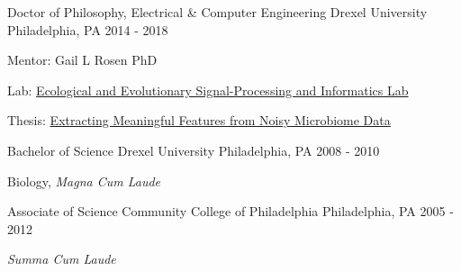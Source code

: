 \begin{cventries}
  \cventry
    {Doctor of Philosophy, Electrical \& Computer Engineering} %
    {Drexel University} %
    {Philadelphia, PA} %
    {2014 - 2018} %
    {
      \begin{cvitems} %
         \item Mentor: Gail L Rosen PhD
         \item Lab: \href{http://drexeleesi.com/}{Ecological and Evolutionary Signal-Processing and Informatics Lab}
	 \item Thesis: \href{https://idea.library.drexel.edu/islandora/object/idea\%3A8189}{Extracting Meaningful Features from Noisy Microbiome Data}
      \end{cvitems}
    }
    
  \cventry
    {Bachelor of Science} %
    {Drexel University} %
    {Philadelphia, PA} %
    {2008 - 2010} %
    {
      \begin{cvitems} %
         \item Biology, \textit{Magna Cum Laude}
      \end{cvitems}
    }
    
  \cventry
    {Associate of Science} %
    {Community College of Philadelphia} %
    {Philadelphia, PA} %
    {2005 - 2012} %
    {
      \begin{cvitems} %
         \item \textit{Summa Cum Laude}
      \end{cvitems}
    }

\end{cventries}
